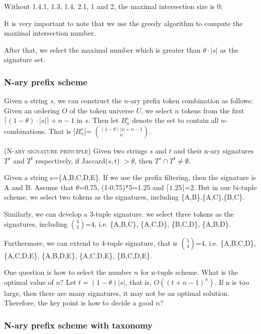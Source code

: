 Without 1.4.1, 1.3, 1.4, 2.1, 1 and 2, the maximal intersection size is $0$;

It is very important to note that we use the greedy algorithm to compute the maximal intersection number.

After that, we select the maximal number which is greater than $\theta \cdot |s|$ as the signature set.

\subsubsection{N-ary prefix scheme}




Given a string $s$, we can construct the $n$-ary prefix token combination as follows:  Given an
ordering $O$ of the token universe $U$, we select $n$ tokens from the first $\lceil (1-
\theta) \cdot |s| \rceil + n -1$ in $s$. Then let $B^s_n$ denote the set to contain all $n$-combinations. That is  $|B^s_n|$= $\binom{(1-\theta)|s|+n-1}{n}$.

\begin{lem} (\textsc{N-ary signature principle}) Given two strings $s$ and $t$ and their n-ary signatures $T^s$ and $T^t$ respectively, if Jaccard($s, t$) $> \theta$, then $T^s \cap T^t \neq \emptyset$.
\end{lem}

Given a string s=\{A,B,C,D,E\}. If we use the prefix filtering, then the signature is A and B. Assume that $\theta$=0.75, (1-0.75)*5=1.25 and $\lceil 1.25 \rceil$=2. But in our bi-tuple scheme, we select two tokens as the signatures, including \{A,B\},\{A,C\},\{B,C\}.

Similarly, we can develop a 3-tuple signature. we select three tokens as the signatures, including $\binom{4}{3}$=4, i.e. \{A,B,C\}, \{A,C,D\}, \{B,C,D\}, \{A,B,D\}.

Furthermore, we can extend to 4-tuple signature, that is $\binom{5}{4}$=4, i.e. \{A,B,C,D\}, \{A,C,D,E\}, \{A,B,D,E\}, \{A,C,D,E\}, \{B,C,D,E\}.

One question is how to select the number $n$ for n-tuple scheme. What is the optimal value of $n$? Let $t= (1-\theta)|s|$, that is, $O((t+n-1)^{n})$. If n is too large, then there are many signatures, it may not be an optimal solution. Therefore, the key point is how to decide a good $n$?


\subsubsection{N-ary prefix scheme with taxonomy}

